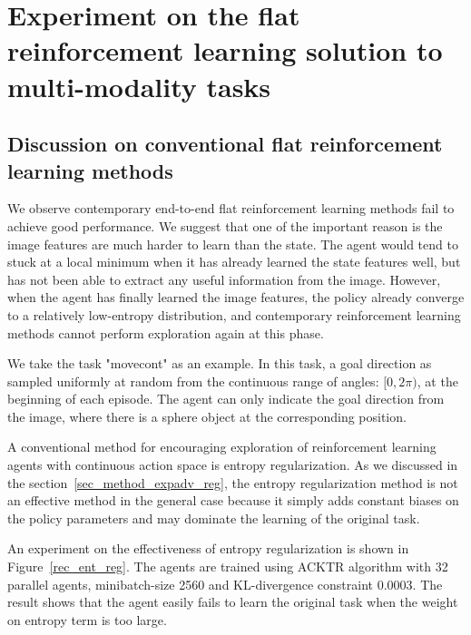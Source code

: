 
\section{Experiment on the flat reinforcement learning solution to multi-modality tasks}
\subsection{Discussion on conventional flat reinforcement learning methods}
We observe contemporary end-to-end flat reinforcement learning methods fail to achieve good performance. We suggest that one of the important reason is the image features are much harder to learn than the state. The agent would tend to stuck at a local minimum when it has already learned the state features well, but has not been able to extract any useful information from the image. However, when the agent has finally learned the image features, the policy already converge to a relatively low-entropy distribution, and contemporary reinforcement learning methods cannot perform exploration again at this phase.

We take the task "movecont" as an example. In this task, a goal direction as sampled uniformly at random from the continuous range of angles: $[0,2\pi)$, at the beginning of each episode. The agent can only indicate the goal direction from the image, where there is a sphere object at the corresponding position.

A conventional method for encouraging exploration of reinforcement learning agents with continuous action space is entropy regularization. As we discussed in the section~\ref{sec_method_expadv_reg}, the entropy regularization method is not an effective method in the general case because it simply adds constant biases on the policy parameters and may dominate the learning of the original task.

An experiment on the effectiveness of entropy regularization is shown in Figure~\ref{rec_ent_reg}. The agents are trained using ACKTR algorithm with 32 parallel agents, minibatch-size 2560 and KL-divergence constraint 0.0003. The result shows that the agent easily fails to learn the original task when the weight on entropy term is too large. 

